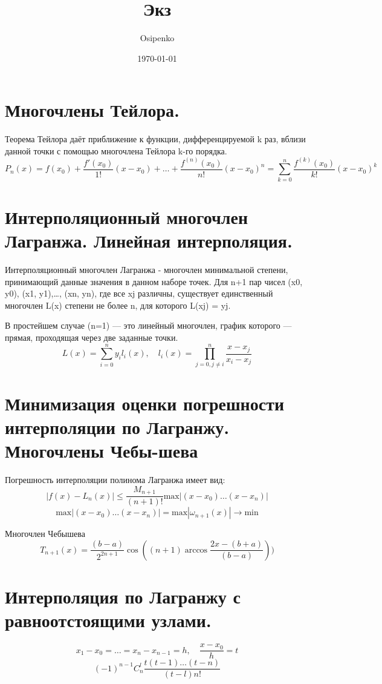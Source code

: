\documentclass[a4paper, 12pt]{article}
\title{Экз}
\author{Osipenko}
\date{\today}
\begin{document}
\sffamily
\maketitle
\section{Многочлены Тейлора.}
Теорема Тейлора даёт приближение к функции, дифференцируемой k раз, вблизи данной точки с помощью многочлена Тейлора k-го порядка.
\[
       P_n(x) = f(x_0) + \frac{f'(x_0)}{1!}(x - x_0) + \ldots + \frac{f^{(n)}(x_0)}{n!}(x - x_0)^n = \sum_{k = 0}^{n} \frac{f^{(k)}(x_0)}{k!}(x - x_0)^k
\]
\section{Интерполяционный многочлен Лагранжа. Линейная интерполяция.}
Интерполяционный многочлен Лагранжа - многочлен минимальной степени, принимающий данные значения в данном наборе точек. Для n+1 пар чисел (x0, y0), (x1, y1),…, (xn, yn), где все xj различны, существует единственный многочлен L(x) степени не более n, для которого L(xj) = yj. 

В простейшем случае (n=1) — это линейный многочлен, график которого — прямая, проходящая через две заданные точки. 
\[
       L(x) = \sum_{i = 0}^n y_il_i(x), \quad l_i(x) = \prod_{j = 0,j\neq i}^n \frac{x - x_j}{x_i - x_j}
\]
\section{Минимизация оценки погрешности интерполяции по Лагранжу. Многочлены Чебы-шева}
Погрешность интерполяции полинома Лагранжа имеет вид:
\[
       |f(x) - L_n(x)| \leq \frac{M_{n+1}}{(n+1)!}\text{max}|(x-x_0)\ldots(x-x_n)|
\]
\[
    \text{max}|(x-x_0)\ldots(x-x_n)| = \text{max}|\omega_{n+1}(x)| \rightarrow \text{min}
\]

Многочлен Чебышева 
\[
       T_{n+1}(x) = \frac{(b-a)}{2^{2n+1}}\cos\left((n+1)\arccos\frac{2x-(b+a)}{(b-a)} \right) )
\]
\section{Интерполяция по Лагранжу с равноотстоящими узлами.}
\[
       x_1 - x_0 = \ldots = x_n - x_{n-1} = h, \quad \frac{x-x_0}{h} = t 
\]
\[
       (-1)^{n-1}C_n^l \frac{t(t-1)\ldots(t-n)}{(t-l)n!}
\]
\end{document}
